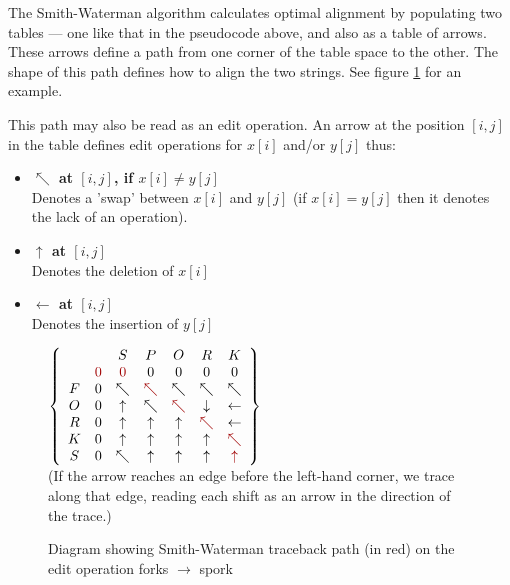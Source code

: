 The Smith-Waterman algorithm calculates optimal alignment by
populating two tables --- one like that in the pseudocode
above, and also as a table of arrows. These arrows define a
path from one corner of the table space to the other. The
shape of this path defines how to align the two
strings.\cite{Smith1981} See figure
\ref{fig:smith-waterman-traceback} for an example.

This path may also be read as an edit operation. An arrow at the
position $[i,j]$ in the table defines edit operations for $x[i]$
and/or $y[j]$ thus:
\begin{itemize}
\item \textbf{$\nwarrow$ at $[i,j]$, if $x[i] \neq y[j]$} \\ Denotes a
  'swap' between $x[i]$ and $y[j]$ (if $x[i] = y[j]$ then it denotes
  the lack of an operation).
\item \textbf{$\uparrow$ at $[i,j]$}\\Denotes the deletion of $x[i]$
\item \textbf{$\leftarrow$ at $[i,j]$}\\Denotes the insertion of
  $y[j]$
\end{itemize}

\begin{figure}[h]
  \centering $\left\{
  \begin{array}{ccccccc}
    & & S & P & O & R & K \\ & \color{red}{0} & \color{red}{0} & 0 & 0
    & 0 & 0 \\ F & 0 & \nwarrow & \color{red}{\nwarrow} & \nwarrow &
    \nwarrow & \nwarrow \\ O & 0 & \uparrow & \nwarrow &
    \color{red}{\nwarrow} & \downarrow & \leftarrow \\ R & 0 &
    \uparrow & \uparrow & \uparrow & \color{red}{\nwarrow} &
    \leftarrow \\ K & 0 & \uparrow & \uparrow & \uparrow & \uparrow &
    \color{red}{\nwarrow} \\ S & 0 & \nwarrow & \uparrow & \uparrow &
    \uparrow & \color{red}{\uparrow} \\
  \end{array}\right\} $\\
  (If the arrow reaches an edge before the left-hand corner, we trace
  along that edge, reading each shift as an arrow in the direction of
  the trace.)
  \caption{Diagram showing Smith-Waterman traceback path (in red) on
    the edit operation forks $\rightarrow$ spork}
  \label{fig:smith-waterman-traceback}
\end{figure}

